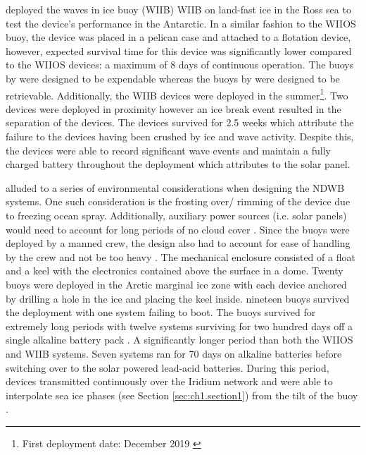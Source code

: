 \textcite{rabault2019open} deployed the waves in ice buoy (WIIB) WIIB on land-fast ice in the Ross sea \cite{rabault2020development} to test the device's performance in the Antarctic. In a similar fashion to the WIIOS buoy, the device was placed in a pelican case and attached to a flotation device, however, expected survival time for this device was significantly lower compared to the WIIOS devices: a maximum of 8 days \cite{rabault2019open} of continuous operation. The buoys by \textcite{kohout2015device} were designed to be expendable \cite{alberello2019drift} whereas the buoys by \textcite{rabault2019open} were designed to be retrievable. Additionally, the WIIB devices were deployed in the summer\footnote{First deployment date: December 2019 \cite{rabault2019open}}. Two devices were deployed in proximity however an ice break event resulted in the separation of the devices. The devices survived for 2.5 weeks \cite{rabault2019open} which \textcite{rabault2019open} attribute the failure to the devices having been crushed by ice and wave activity. Despite this, the devices were able to record significant wave events and maintain a fully charged battery throughout the deployment which \textcite{rabault2019open} attributes to the solar panel. 

\par \textcite{doble2017robust} alluded to a series of environmental considerations when designing the NDWB systems. One such consideration is the frosting over/ rimming of the device due to freezing ocean spray. Additionally, auxiliary power sources (i.e. solar panels) would need to account for long periods of no cloud cover \cite{doble2017robust}. Since the buoys were deployed by a manned crew, the design also had to account for ease of handling by the crew and not be too heavy \cite{doble2017robust}. The mechanical enclosure consisted of a float and a keel with the electronics contained above the surface in a dome. Twenty buoys were deployed in the Arctic marginal ice zone with each device anchored by drilling a hole in the ice and placing the keel inside. nineteen buoys survived the deployment with one system failing to boot. The buoys survived for extremely long periods with twelve systems surviving for two hundred days off a single alkaline battery pack \cite{doble2017robust}. A significantly longer period than both the WIIOS and WIIB systems. Seven systems ran for 70 days on alkaline batteries before switching over to  the solar powered lead-acid batteries. During this period, devices transmitted continuously over the Iridium network and were able to interpolate sea ice phases (see Section \ref{sec:ch1.section1}) from the tilt of the buoy \cite{doble2017robust}.

